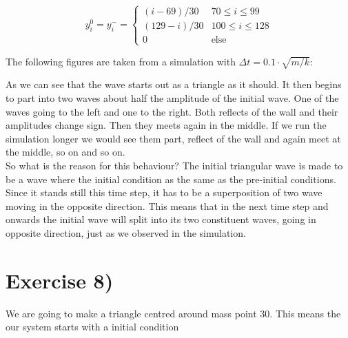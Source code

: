 \documentclass[a4paper,norsk, 10pt]{article}
\begin{document}
\begin{equation}
y_i^0 = y_i^- = 
\begin{cases}
(i-69)/30 & 70 \leq i \leq 99\\
(129 -i)/30 & 100 \leq i \leq 128\\
0 & \text{else}
\end{cases}
\end{equation}

The following figures are taken from a simulation with $\Delta t = 0.1\cdot\sqrt{m/k}$:


\begin{figure}[H]
\captionsetup[subfigure]{position=b}
\centering
{}
\par
{}
\par{}
\end{figure}

As we can see that the wave starts out as a triangle as it should. It then begins to part into two waves about half the amplitude of the initial wave. One of the waves going to the left and one to the right. Both reflects of the wall and their amplitudes change sign. Then they meets again in the middle. If we run the simulation longer we would see them part, reflect of the wall and again meet at the middle, so on and so on.\\

So what is the reason for this behaviour? The initial triangular wave is made to be a wave where the initial condition as the same as the pre-initial conditions. Since it stands still this time step, it has to be a superposition of two wave moving in the opposite direction. This means that in the next time step and onwards the initial wave will split into its two constituent waves, going in opposite direction, just as we observed in the simulation.






\section{Exercise 8)}
We are going to make a triangle centred around mass point 30. This means the our system starts with a initial condition
\end{document}
